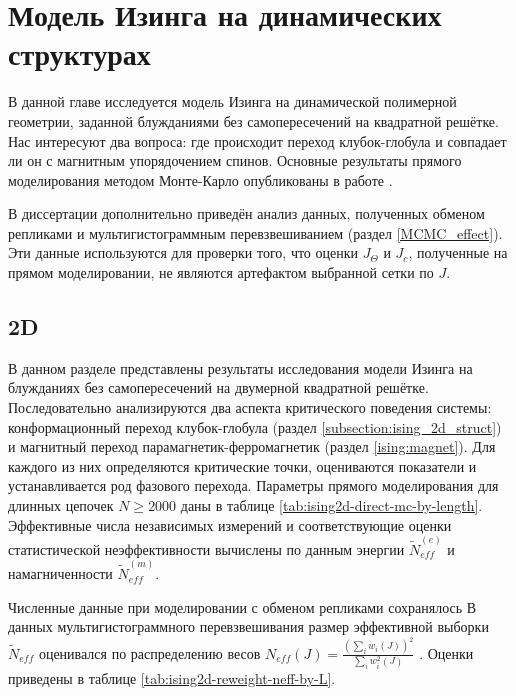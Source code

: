 \chapter{Модель Изинга на динамических структурах}
\label{ch:ch3}

В данной главе исследуется модель Изинга на динамической полимерной геометрии, заданной блужданиями без самопересечений на квадратной решётке. 
Нас интересуют два вопроса: где происходит переход клубок-глобула и совпадает ли он с магнитным упорядочением спинов.
Основные результаты прямого моделирования методом Монте-Карло опубликованы в работе \cite{faizullina2021critical1}. 


В диссертации дополнительно приведён анализ данных, полученных обменом репликами и мультигистограммным перевзвешиванием (раздел \ref{MCMC_effect}). 
Эти данные используются для проверки того, что оценки $J_\Theta$ и $J_c$, полученные на прямом моделировании, не являются артефактом выбранной сетки по $J$.


 
 \section{2D}
 
 В данном разделе представлены результаты исследования модели Изинга на блужданиях без самопересечений на двумерной квадратной решётке. Последовательно анализируются два аспекта критического поведения системы: конформационный переход клубок-глобула (раздел \ref{subsection:ising_2d_struct}) и магнитный переход парамагнетик-ферромагнетик (раздел \ref{ising:magnet}). 
 Для каждого из них определяются критические точки, оцениваются показатели и устанавливается род фазового перехода. 
 Параметры прямого моделирования для длинных цепочек $N \ge 2000$ даны в  таблице \ref{tab:ising2d-direct-mc-by-length}. Эффективные числа независимых измерений и соответствующие оценки статистической неэффективности вычислены по данным энергии  $ \widetilde    N_{eff}  ^{(e)}$ и намагниченности $\widetilde  N_{eff} ^{(m)}$.
 
 Численные данные при моделировании с обменом репликами сохранялось 
  В данных мультигистограммного перевзвешивания размер эффективной выборки $\widetilde  N_{eff}$ оценивался по распределению  весов   $ N_{eff}(J)= \frac{\left(\sum_i w_i(J)\right)^2}{\sum_i w_i^2(J)}$  \cite{https://doi.org/10.1111/insr.12500}. Оценки  приведены в таблице \ref{tab:ising2d-reweight-neff-by-L}.
 
